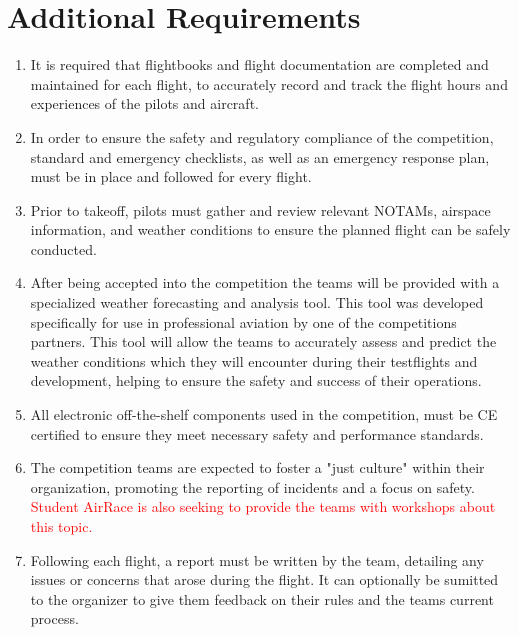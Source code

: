 \documentclass{article}
\begin{document}
\section{Additional Requirements}
\begin{enumerate}
  \item It is required that flightbooks and flight documentation are completed and maintained for each flight, to accurately record and track the flight hours and experiences of the pilots and aircraft.
  \item In order to ensure the safety and regulatory compliance of the competition, standard and emergency checklists, as well as an emergency response plan, must be in place and followed for every flight.
  \item Prior to takeoff, pilots must gather and review relevant NOTAMs, airspace information, and weather conditions to ensure the planned flight can be safely conducted.
  \item After being accepted into the competition the teams will be provided with a specialized weather forecasting and analysis tool. This tool was developed specifically for use in professional aviation by one of the competitions partners. 
  This tool will allow the teams to accurately assess and predict the weather conditions which they will encounter during their testflights and development, helping to ensure the safety and success of their operations. 
  \item All electronic off-the-shelf components used in the competition, must be CE certified to ensure they meet necessary safety and performance standards.
  \item The competition teams are expected to foster a "just culture" within their organization, promoting the reporting of incidents and a focus on safety. \textcolor{red}{Student AirRace is also seeking to provide the teams with workshops about this topic.}
  \item Following each flight, a report must be written by the team, detailing any issues or concerns that arose during the flight. It can optionally be sumitted to the organizer to give them feedback on their rules and the teams current process.
\end{enumerate}
\end{document}
